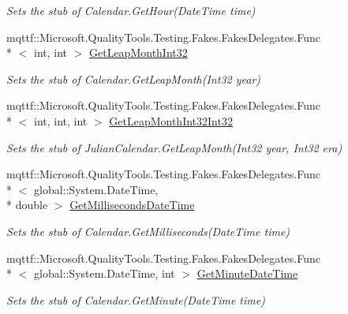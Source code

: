 \begin{DoxyCompactItemize}
\begin{DoxyCompactList}\small\item\em Sets the stub of Calendar.\-Get\-Hour(\-Date\-Time time)\end{DoxyCompactList}\item 
mqttf\-::\-Microsoft.\-Quality\-Tools.\-Testing.\-Fakes.\-Fakes\-Delegates.\-Func\\*
$<$ int, int $>$ \hyperlink{class_system_1_1_globalization_1_1_fakes_1_1_stub_julian_calendar_ab45ade40a11e1b0732ffcbbd56eab607}{Get\-Leap\-Month\-Int32}
\begin{DoxyCompactList}\small\item\em Sets the stub of Calendar.\-Get\-Leap\-Month(\-Int32 year)\end{DoxyCompactList}\item 
mqttf\-::\-Microsoft.\-Quality\-Tools.\-Testing.\-Fakes.\-Fakes\-Delegates.\-Func\\*
$<$ int, int, int $>$ \hyperlink{class_system_1_1_globalization_1_1_fakes_1_1_stub_julian_calendar_a8ba081edcdbc8c16c74762506d96c001}{Get\-Leap\-Month\-Int32\-Int32}
\begin{DoxyCompactList}\small\item\em Sets the stub of Julian\-Calendar.\-Get\-Leap\-Month(\-Int32 year, Int32 era)\end{DoxyCompactList}\item 
mqttf\-::\-Microsoft.\-Quality\-Tools.\-Testing.\-Fakes.\-Fakes\-Delegates.\-Func\\*
$<$ global\-::\-System.\-Date\-Time, \\*
double $>$ \hyperlink{class_system_1_1_globalization_1_1_fakes_1_1_stub_julian_calendar_a40c9a1bd8c24e2f6a45fdf3c848a19e4}{Get\-Milliseconds\-Date\-Time}
\begin{DoxyCompactList}\small\item\em Sets the stub of Calendar.\-Get\-Milliseconds(\-Date\-Time time)\end{DoxyCompactList}\item 
mqttf\-::\-Microsoft.\-Quality\-Tools.\-Testing.\-Fakes.\-Fakes\-Delegates.\-Func\\*
$<$ global\-::\-System.\-Date\-Time, int $>$ \hyperlink{class_system_1_1_globalization_1_1_fakes_1_1_stub_julian_calendar_a8d7103b2f9ff5aa44d00d06e9a8e809a}{Get\-Minute\-Date\-Time}
\begin{DoxyCompactList}\small\item\em Sets the stub of Calendar.\-Get\-Minute(\-Date\-Time time)\end{DoxyCompactList}\item 

\end{DoxyCompactItemize}

